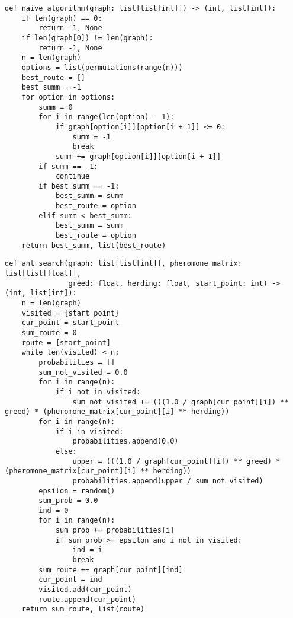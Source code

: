 \documentclass{bmstu}
\begin{document}
\begin{center}
\captionsetup{justification=raggedright,singlelinecheck=off}
\begin{lstlisting}[label=lst:full,caption=Реализация алгоритма решения задачи коммивояжера полным перебором]
def naive_algorithm(graph: list[list[int]]) -> (int, list[int]):
    if len(graph) == 0:
        return -1, None
    if len(graph[0]) != len(graph):
        return -1, None
    n = len(graph)
    options = list(permutations(range(n)))
    best_route = []
    best_summ = -1
    for option in options:
        summ = 0
        for i in range(len(option) - 1):
            if graph[option[i]][option[i + 1]] <= 0:
                summ = -1
                break
            summ += graph[option[i]][option[i + 1]]
        if summ == -1:
            continue
        if best_summ == -1:
            best_summ = summ
            best_route = option
        elif summ < best_summ:
            best_summ = summ
            best_route = option
    return best_summ, list(best_route)
\end{lstlisting}
\end{center}
\clearpage
\begin{center}
\captionsetup{justification=raggedright,singlelinecheck=off}
\begin{lstlisting}[label=lst:one_ant,caption=Функция обхода графа одним муравьем]
def ant_search(graph: list[list[int]], pheromone_matrix: list[list[float]],
               greed: float, herding: float, start_point: int) -> (int, list[int]):
    n = len(graph)
    visited = {start_point}
    cur_point = start_point
    sum_route = 0
    route = [start_point]
    while len(visited) < n:
        probabilities = []
        sum_not_visited = 0.0
        for i in range(n):
            if i not in visited:
                sum_not_visited += (((1.0 / graph[cur_point][i]) ** greed) * (pheromone_matrix[cur_point][i] ** herding))
        for i in range(n):
            if i in visited:
                probabilities.append(0.0)
            else:
                upper = (((1.0 / graph[cur_point][i]) ** greed) * (pheromone_matrix[cur_point][i] ** herding))
                probabilities.append(upper / sum_not_visited)
        epsilon = random()
        sum_prob = 0.0
        ind = 0
        for i in range(n):
            sum_prob += probabilities[i]
            if sum_prob >= epsilon and i not in visited:
                ind = i
                break
        sum_route += graph[cur_point][ind]
        cur_point = ind
        visited.add(cur_point)
        route.append(cur_point)
    return sum_route, list(route)
\end{lstlisting}
\end{center}
\end{document}
